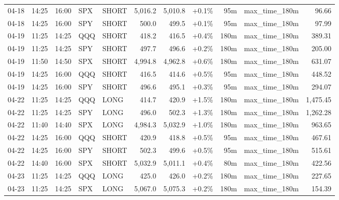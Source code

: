 \documentclass[11pt,a4paper,twoside]{article}
\begin{document}
\begin{center}
\begin{longtable}{>{\color{txtmain}}l l l l l r r r r >{\color{txtmain}}l r}
04-18 & 14:25 & 16:00 & SPX & SHORT & 5,016.2 & 5,010.8 & \textcolor{wingreen}{+0.1\%} & 95m & max\_time\_180m & \textcolor{wingreen}{96.66} \\
04-18 & 14:25 & 16:00 & SPY & SHORT & 500.0 & 499.5 & \textcolor{wingreen}{+0.1\%} & 95m & max\_time\_180m & \textcolor{wingreen}{97.99} \\
04-19 & 11:25 & 14:25 & QQQ & SHORT & 418.2 & 416.5 & \textcolor{wingreen}{+0.4\%} & 180m & max\_time\_180m & \textcolor{wingreen}{389.31} \\
04-19 & 11:25 & 14:25 & SPY & SHORT & 497.7 & 496.6 & \textcolor{wingreen}{+0.2\%} & 180m & max\_time\_180m & \textcolor{wingreen}{205.00} \\
04-19 & 11:50 & 14:50 & SPX & SHORT & 4,994.8 & 4,962.8 & \textcolor{wingreen}{+0.6\%} & 180m & max\_time\_180m & \textcolor{wingreen}{631.07} \\
04-19 & 14:25 & 16:00 & QQQ & SHORT & 416.5 & 414.6 & \textcolor{wingreen}{+0.5\%} & 95m & max\_time\_180m & \textcolor{wingreen}{448.52} \\
04-19 & 14:25 & 16:00 & SPY & SHORT & 496.6 & 495.1 & \textcolor{wingreen}{+0.3\%} & 95m & max\_time\_180m & \textcolor{wingreen}{294.07} \\
04-22 & 11:25 & 14:25 & QQQ & LONG & 414.7 & 420.9 & \textcolor{wingreen}{+1.5\%} & 180m & max\_time\_180m & \textcolor{wingreen}{1,475.45} \\
04-22 & 11:25 & 14:25 & SPY & LONG & 496.0 & 502.3 & \textcolor{wingreen}{+1.3\%} & 180m & max\_time\_180m & \textcolor{wingreen}{1,262.28} \\
04-22 & 11:40 & 14:40 & SPX & LONG & 4,984.3 & 5,032.9 & \textcolor{wingreen}{+1.0\%} & 180m & max\_time\_180m & \textcolor{wingreen}{963.65} \\
04-22 & 14:25 & 16:00 & QQQ & SHORT & 420.9 & 418.8 & \textcolor{wingreen}{+0.5\%} & 95m & max\_time\_180m & \textcolor{wingreen}{467.61} \\
04-22 & 14:25 & 16:00 & SPY & SHORT & 502.3 & 499.6 & \textcolor{wingreen}{+0.5\%} & 95m & max\_time\_180m & \textcolor{wingreen}{515.61} \\
04-22 & 14:40 & 16:00 & SPX & SHORT & 5,032.9 & 5,011.1 & \textcolor{wingreen}{+0.4\%} & 80m & max\_time\_180m & \textcolor{wingreen}{422.56} \\
04-23 & 11:25 & 14:25 & QQQ & LONG & 425.0 & 426.0 & \textcolor{wingreen}{+0.2\%} & 180m & max\_time\_180m & \textcolor{wingreen}{227.65} \\
04-23 & 11:25 & 14:25 & SPX & LONG & 5,067.0 & 5,075.3 & \textcolor{wingreen}{+0.2\%} & 180m & max\_time\_180m & \textcolor{wingreen}{154.39} \\

\end{longtable}
\end{center}
\end{document}
